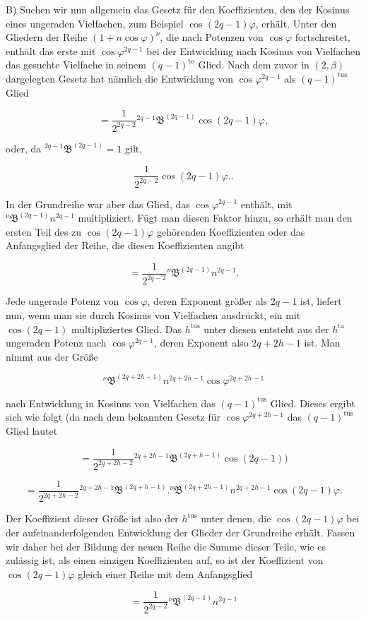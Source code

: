 \par\noindent{}%
\hspace*{\parindent}B) Suchen wir nun allgemein das Gesetz für den Koeffizienten, den der Kosinus eines ungeraden Vielfachen, zum Beispiel $\cos(2q-1)\varphi$, erhält. Unter den Gliedern der Reihe $(1+n\cos\varphi)^{\nu}$, die nach Potenzen von $\cos\varphi$ fortschreitet, enthält das erste mit $\cos\varphi^{2q-1}$ bei der Entwicklung nach Kosinus von Vielfachen das gesuchte Vielfache in seinem $(q-1)^{\text{to}}$ Glied. Nach dem zuvor in $(2,\beta)$ dargelegten Gesetz hat nämlich die Entwicklung von $\cos\varphi^{2q-1}$ als $(q-1)^{\text{tus}}$ Glied

\[
= \frac{1}{2^{2q-2}} {}^{2q-1}\mathfrak{B}^{(2q-1)} \cos(2q-1)\varphi,
\]

\noindent oder, da ${}^{2q-1}\mathfrak{B}^{(2q-1)} = 1$ gilt,

\[
\frac{1}{2^{2q-2}} \cos(2q-1)\varphi..
\]

\noindent In der Grundreihe war aber das Glied, das $\cos\varphi^{2q-1}$ enthält, mit ${}^{\nu}\mathfrak{B}^{(2q-1)} n^{2q-1}$ multipliziert. Fügt man diesen Faktor hinzu, so erhält man den ersten Teil des zu $\cos(2q-1)\varphi$ gehörenden Koeffizienten oder das Anfangsglied der Reihe, die diesen Koeffizienten angibt

\[
= \frac{1}{2^{2q-2}} {}^{\nu}\mathfrak{B}^{(2q-1)} n^{2q-1}.
\]

\noindent Jede ungerade Potenz von $\cos\varphi$, deren Exponent größer als $2q-1$ ist, liefert nun, wenn man sie durch Kosinus von Vielfachen ausdrückt, ein mit $\cos(2q-1)$ multipliziertes Glied. Das $h^{\text{tus}}$ unter diesen entsteht aus der $h^{\text{ta}}$ ungeraden Potenz nach $\cos\varphi^{2q-1}$, deren Exponent also $2q+2h-1$ ist. Man nimmt aus der Größe

\[
{}^{\nu}\mathfrak{B}^{(2q+2h-1)} n^{2q+2h-1} \cos\varphi^{2q+2h-1}
\]

\noindent nach Entwicklung in Kosinus von Vielfachen das $(q-1)^{\text{tus}}$ Glied. Dieses ergibt sich wie folgt (da nach dem bekannten Gesetz für $\cos\varphi^{2q+2h-1}$ das $(q-1)^{\text{tus}}$ Glied lautet

\[
= \frac{1}{2^{2q+2h-2}} {}^{2q+2h-1}\mathfrak{B}^{(2q+h-1)} \cos(2q-1)) 
\]

\[
= \frac{1}{2^{2q+2h-2}} {}^{2q+2h-1}\mathfrak{B}^{(2q+h-1)}  .  {}^{\nu}\mathfrak{B}^{(2q+2h-1)} n^{2q+2h-1} \cos(2q-1)\varphi.
\]

\noindent Der Koeffizient dieser Größe ist also der $h^{\text{tus}}$ unter denen, die $\cos(2q-1)\varphi$ bei der aufeinanderfolgenden Entwicklung der Glieder der Grundreihe erhält. Fassen wir daher bei der Bildung der neuen Reihe die Summe dieser Teile, wie es zulässig ist, als einen einzigen Koeffizienten auf, so ist der Koeffizient von $\cos(2q-1)\varphi$ gleich einer Reihe mit dem Anfangsglied

\[
= \frac{1}{2^{2q-2}} {}^{\nu}\mathfrak{B}^{(2q-1)} n^{2q-1}
\]
